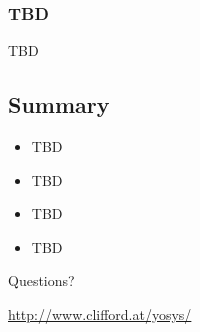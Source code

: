 \begin{frame}
\subsectionpage
\subsectionpagesuffix
\end{frame}

\subsubsection{TBD}

\begin{frame}{\subsubsecname}
TBD
\end{frame}


\subsection{Summary}

\begin{frame}{\subsecname}
\begin{itemize}
\item TBD
\item TBD
\item TBD
\item TBD
\end{itemize}

\bigskip
\bigskip
\begin{center}
Questions?
\end{center}

\bigskip
\bigskip
\begin{center}
\url{http://www.clifford.at/yosys/}
\end{center}
\end{frame}

